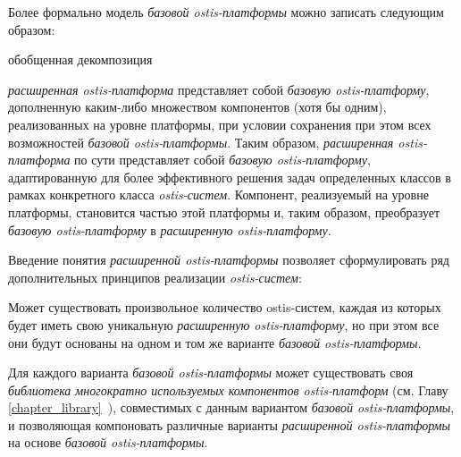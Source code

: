 Более формально модель \textit{базовой ostis-платформы} можно записать следующим образом:

\begin{SCn}
\begin{scnrelfromset}{обобщенная декомпозиция}
	\begin{scnindent}
	\end{scnindent}
\end{scnrelfromset}
\end{SCn}

\textit{расширенная ostis-платформа} представляет собой \textit{базовую ostis-платформу}, дополненную каким-либо множеством компонентов (хотя бы одним), реализованных на уровне платформы, при условии сохранения при этом всех возможностей \textit{базовой ostis-платформы}. Таким образом, \textit{расширенная ostis-платформа} по сути представляет собой \textit{базовую ostis-платформу}, адаптированную для более эффективного решения задач определенных классов в рамках конкретного класса \textit{ostis-систем}. Компонент, реализуемый на уровне платформы, становится частью этой платформы и, таким образом,  преобразует \textit{базовую ostis-платформу} в \textit{расширенную ostis-платформу}. 

Введение понятия \textit{расширенной ostis-платформы} позволяет сформулировать ряд дополнительных принципов реализации \textit{ostis-систем}:
\begin{textitemize}
	\item Может существовать произвольное количество ostis-систем, каждая из которых будет иметь свою уникальную \textit{расширенную ostis-платформу}, но при этом все они будут основаны на одном и том же варианте \textit{базовой ostis-платформы}.
	\item Для каждого варианта \textit{базовой ostis-платформы} может существовать своя \textit{библиотека многократно используемых компонентов ostis-платформ} (см. Главу \ref{chapter_library}~), совместимых с данным вариантом \textit{базовой ostis-платформы}, и позволяющая компоновать различные варианты \textit{расширенной ostis-платформы} на основе \textit{базовой ostis-платформы}.
\end{textitemize} 

